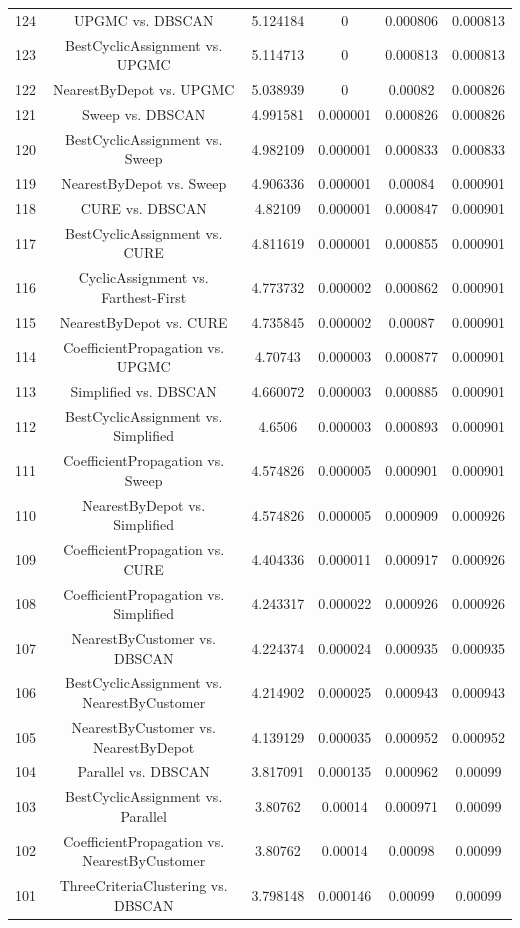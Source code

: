 \documentclass[a4paper,10pt]{article}
\begin{document}
\begin{landscape}
\begin{table}[!htp]
\begin{tabular}{cccccc}
124&UPGMC vs. DBSCAN&5.124184&0&0.000806&0.000813\\
123&BestCyclicAssignment vs. UPGMC&5.114713&0&0.000813&0.000813\\
122&NearestByDepot vs. UPGMC&5.038939&0&0.00082&0.000826\\
121&Sweep vs. DBSCAN&4.991581&0.000001&0.000826&0.000826\\
120&BestCyclicAssignment vs. Sweep&4.982109&0.000001&0.000833&0.000833\\
119&NearestByDepot vs. Sweep&4.906336&0.000001&0.00084&0.000901\\
118&CURE vs. DBSCAN&4.82109&0.000001&0.000847&0.000901\\
117&BestCyclicAssignment vs. CURE&4.811619&0.000001&0.000855&0.000901\\
116&CyclicAssignment vs. Farthest-First&4.773732&0.000002&0.000862&0.000901\\
115&NearestByDepot vs. CURE&4.735845&0.000002&0.00087&0.000901\\
114&CoefficientPropagation vs. UPGMC&4.70743&0.000003&0.000877&0.000901\\
113&Simplified vs. DBSCAN&4.660072&0.000003&0.000885&0.000901\\
112&BestCyclicAssignment vs. Simplified&4.6506&0.000003&0.000893&0.000901\\
111&CoefficientPropagation vs. Sweep&4.574826&0.000005&0.000901&0.000901\\
110&NearestByDepot vs. Simplified&4.574826&0.000005&0.000909&0.000926\\
109&CoefficientPropagation vs. CURE&4.404336&0.000011&0.000917&0.000926\\
108&CoefficientPropagation vs. Simplified&4.243317&0.000022&0.000926&0.000926\\
107&NearestByCustomer vs. DBSCAN&4.224374&0.000024&0.000935&0.000935\\
106&BestCyclicAssignment vs. NearestByCustomer&4.214902&0.000025&0.000943&0.000943\\
105&NearestByCustomer vs. NearestByDepot&4.139129&0.000035&0.000952&0.000952\\
104&Parallel vs. DBSCAN&3.817091&0.000135&0.000962&0.00099\\
103&BestCyclicAssignment vs. Parallel&3.80762&0.00014&0.000971&0.00099\\
102&CoefficientPropagation vs. NearestByCustomer&3.80762&0.00014&0.00098&0.00099\\
101&ThreeCriteriaClustering vs. DBSCAN&3.798148&0.000146&0.00099&0.00099\\

\end{tabular}
\end{table}
\end{landscape}
\end{document}
